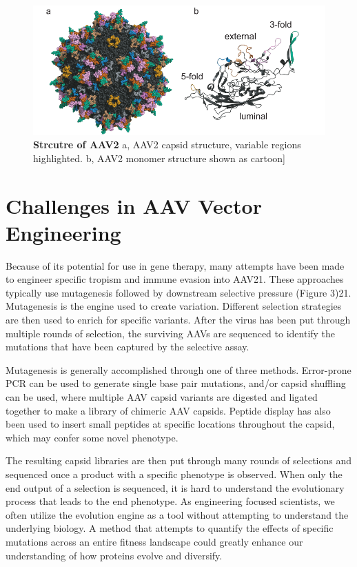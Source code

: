 \begin{figure}
\includegraphics[width=\textwidth]{figures/20190612_viral_capdis_vr.pdf}
\caption[Structure of AAV2]{\textbf{Strcutre of AAV2}
a, AAV2 capsid structure, variable regions highlighted. b, AAV2 monomer structure shown as cartoon]
\label{fig:Figure 0.2}}
\end{figure}

\section{Challenges in AAV Vector Engineering}

Because of its potential for use in gene therapy, many attempts have been made to engineer specific tropism and immune evasion into AAV21. These approaches typically use mutagenesis followed by downstream selective pressure (Figure 3)21. Mutagenesis is the engine used to create variation. Different selection strategies are then used to enrich for specific variants.  After the virus has been put through multiple rounds of selection, the surviving AAVs are sequenced to identify the mutations that have been captured by the selective assay. 

Mutagenesis is generally accomplished through one of three methods. Error-prone PCR can be used to generate single base pair mutations\cite{Grimm2015-jz}, and/or capsid shuffling can be used, where multiple AAV capsid variants are digested and ligated together to make a library of chimeric AAV capsids. Peptide display has also been used to insert small peptides at specific locations throughout the capsid, which may confer some novel phenotype\cite{Kotterman2014-yx}. 

The resulting capsid libraries are then put through many rounds of selections and sequenced once a product with a specific phenotype is observed. When only the end output of a selection is sequenced, it is hard to understand the evolutionary process that leads to the end phenotype. As engineering focused scientists, we often utilize the evolution engine as a tool without attempting to understand the underlying biology. A method that attempts to quantify the effects of specific mutations across an entire fitness landscape could greatly enhance our understanding of how proteins evolve and diversify.  

